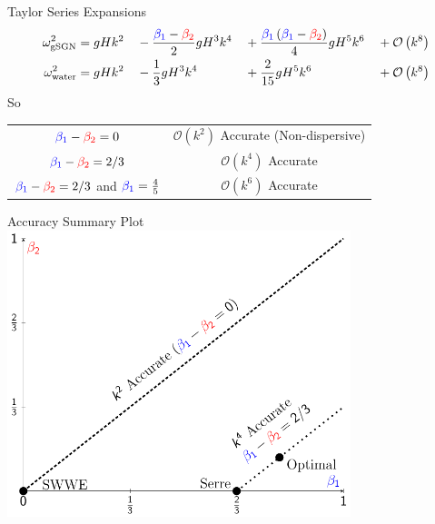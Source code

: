 \documentclass[pdf]{beamer}
\begin{document}
\begin{frame}{Taylor Series Expansions}
\begin{align*}
\omega_{\text{gSGN}}^2 & = gH k^2 &&-\frac{ {\color{blue}\beta_1} - {\color{red}\beta_2}  }{2} g H^3  k^4 &&+ \frac{{\color{blue}\beta_1}\left({\color{blue}\beta_1}- {\color{red}\beta_2}\right) }{4}  g H^5 k^6 &&+ \mathcal{O}\left(k^8\right)\\
\omega_{\text{water}}^2 & = gH k^2 &&-\frac{1}{3}gH^3 k^4   &&+ \frac{2}{15} gH^5 k^6  &&+ \mathcal{O}\left(k^8\right) 
\end{align*}
\pause
So 
\begin{table}
\begin{tabular}{c | c}
${\color{blue}\beta_1} - {\color{red}\beta_2}  = 0$ & $\mathcal{O}\left(k^2\right) $ Accurate (Non-dispersive)\\
${\color{blue}\beta_1} - {\color{red}\beta_2}  = 2/3$ & $\mathcal{O}\left(k^4\right) $ Accurate \\
${\color{blue}\beta_1} - {\color{red}\beta_2}  = 2/3$ and ${\color{blue}\beta_1} = \frac{4}{5}$  & $\mathcal{O}\left(k^6\right) $ Accurate \\
\end{tabular}
\end{table}
\end{frame}


\begin{frame}{Accuracy Summary Plot}
\centering
	\includegraphics[width=0.75\textwidth]{./Pics/Tex/Explanatory/RegionsPlot/AccuracySummary.pdf}
\end{frame}
\end{document}
